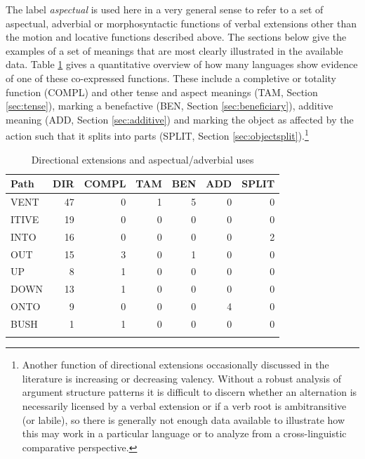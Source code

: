 The label \textit{aspectual} is used here in a very general sense to refer to a set of aspectual, adverbial or morphosyntactic functions of verbal extensions other than the motion and locative functions described above. The sections below give the examples of a set of meanings that are most clearly illustrated in the available data. Table \ref{tab:DIR_gram} gives a quantitative overview of how many languages show evidence of one of these co-expressed functions. These include a completive or totality function (COMPL) and other tense and aspect meanings (TAM, Section \ref{sec:tense}), marking a benefactive (BEN, Section \ref{sec:beneficiary}), additive meaning (ADD, Section \ref{sec:additive}) and marking the object as affected by the action such that it splits into parts (SPLIT, Section \ref{sec:objectsplit}).\footnote{Another function of directional extensions occasionally discussed in the literature is increasing or decreasing valency. Without a robust analysis of argument structure patterns it is difficult to discern whether an alternation is necessarily licensed by a verbal extension or if a verb root is ambitransitive (or labile), so there is generally not enough data available to illustrate how this may work in a particular language or to analyze from a cross-linguistic comparative perspective.}

\begin{table}
	\caption{Directional extensions and aspectual/adverbial uses}
	\label{tab:DIR_gram}
	\begin{tabular}{lrrrrrr} %
		\lsptoprule
     Path &  DIR &  COMPL &  TAM &  BEN &  ADD &  SPLIT \\
\midrule
VENT &   47 &      0 &    1 &    5 &    0 &      0 \\
ITIVE &   19 &      0 &    0 &    0 &    0 &      0 \\
INTO &   16 &      0 &    0 &    0 &    0 &      2 \\
OUT &   15 &      3 &    0 &    1 &    0 &      0 \\
UP &    8 &      1 &    0 &    0 &    0 &      0 \\
DOWN &   13 &      1 &    0 &    0 &    0 &      0 \\
ONTO &    9 &      0 &    0 &    0 &    4 &      0 \\
BUSH &    1 &      1 &    0 &    0 &    0 &      0 \\
		\lspbottomrule
	\end{tabular}
\end{table}

